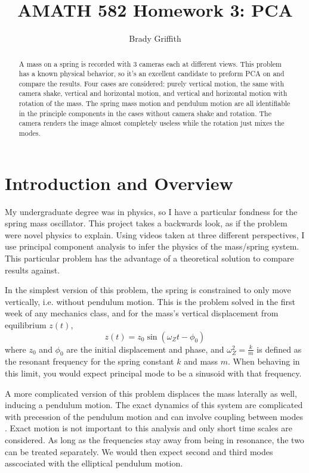 \documentclass{article}
\title{AMATH 582 Homework 3: PCA}
\author{Brady Griffith}
\begin{document}
    \maketitle

    \begin{abstract}
        A mass on a spring is recorded with 3 cameras each at different views.
        This problem has a known physical behavior, so it's an excellent candidate
        to preform PCA on and compare the results. Four cases are considered:
        purely vertical motion, the same with camera shake, vertical and
        horizontal motion, and vertical and horizontal motion with rotation of
        the mass. The spring mass motion and pendulum motion are all identifiable
        in the principle components in the cases without camera shake and rotation.
        The camera renders the image almost completely useless while the rotation
        just mixes the modes.
    \end{abstract}

    \section{Introduction and Overview}
    My undergraduate degree was in physics, so I have a particular fondness for
    the spring mass oscillator. This project takes a backwards look, as if the
    problem were novel physics to explain. Using videos taken at three different
    perspectives, I use principal component analysis to infer the physics of the
    mass/spring system. This particular problem has the advantage of a
    theoretical solution to compare results against.

    In the simplest version of this problem, the spring is constrained to only
    move vertically, i.e. without pendulum motion. This is the problem
    solved in the first week of any mechanics class, and for the mass's vertical
    displacement from equilibrium $z(t)$,
    \begin{equation}
        z(t) = z_0 \sin(\omega_Z t - \phi_0)
    \end{equation}
    where $z_0$ and $\phi_0$ are the initial displacement and phase, and
    $\omega_Z^2 = \frac{k}{m}$ is defined as the resonant frequency for the
    spring constant $k$ and mass $m$. When behaving in this limit, you would
    expect principal mode to be a sinusoid with that frequency.

    A more complicated version of this problem displaces the mass laterally as
    well, inducing a pendulum motion. The exact dynamics of this system are 
    complicated with precession of the pendulum motion and can involve coupling
    between modes \cite{Lynch2002}. Exact motion is not important to this
    analysis and only short time scales are considered. As long as the
    frequencies stay away from being in resonance, the two can be treated
    separately. We would then expect second and third modes asscociated with the
    elliptical pendulum motion.
\end{document}
